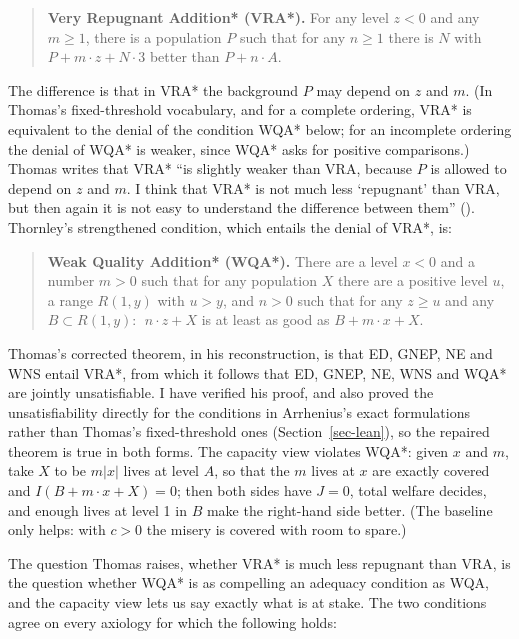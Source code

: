 \documentclass[
  11pt,
  letterpaper,
  DIV=11,
  numbers=noendperiod,
  twoside]{scrartcl}
\begin{document}
\begin{quote}
\textbf{Very Repugnant Addition* (VRA*).} For any level \(z < 0\) and
any \(m \geq 1\), there is a population \(P\) such that for any
\(n \geq 1\) there is \(N\) with \(P + m \cdot z + N \cdot 3\) better
than \(P + n \cdot A\).
\end{quote}

The difference is that in VRA* the background \(P\) may depend on \(z\)
and \(m\). (In Thomas's fixed-threshold vocabulary, and for a complete
ordering, VRA* is equivalent to the denial of the condition WQA* below;
for an incomplete ordering the denial of WQA* is weaker, since WQA* asks
for positive comparisons.) Thomas writes that VRA* ``is slightly weaker
than VRA, because \(P\) is allowed to depend on \(z\) and \(m\). I think
that VRA* is not much less `repugnant' than VRA, but then again it is
not easy to understand the difference between them''
(). Thornley's strengthened
condition, which entails the denial of VRA*, is:

\begin{quote}
\textbf{Weak Quality Addition* (WQA*).} There are a level \(x < 0\) and
a number \(m > 0\) such that for any population \(X\) there are a
positive level \(u\), a range \(R(1,y)\) with \(u > y\), and \(n > 0\)
such that for any \(z \geq u\) and any \(B \subset R(1,y)\):
\(\;n \cdot z + X\) is at least as good as \(B + m \cdot x + X\).
\end{quote}

Thomas's corrected theorem, in his reconstruction, is that ED, GNEP, NE
and WNS entail VRA*, from which it follows that ED, GNEP, NE, WNS and
WQA* are jointly unsatisfiable. I have verified his proof, and also
proved the unsatisfiability directly for the conditions in Arrhenius's
exact formulations rather than Thomas's fixed-threshold ones
(Section~\ref{sec-lean}), so the repaired theorem is true in both forms.
The capacity view violates WQA*: given \(x\) and \(m\), take \(X\) to be
\(m|x|\) lives at level \(A\), so that the \(m\) lives at \(x\) are
exactly covered and \(I(B + m \cdot x + X) = 0\); then both sides have
\(J = 0\), total welfare decides, and enough lives at level 1 in \(B\)
make the right-hand side better. (The baseline only helps: with
\(c > 0\) the misery is covered with room to spare.)

The question Thomas raises, whether VRA* is much less repugnant than
VRA, is the question whether WQA* is as compelling an adequacy condition
as WQA, and the capacity view lets us say exactly what is at stake. The
two conditions agree on every axiology for which the following holds:
\end{document}
